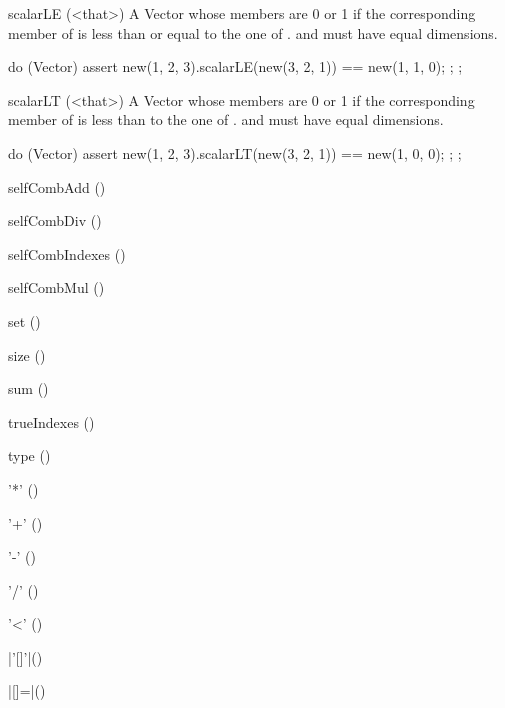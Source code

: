 \begin{urbiscriptapi}
\item[scalarLE](<that>)%
  A Vector whose members are 0 or 1 if the corresponding member of \this is
  less than or equal to the one of \that.  \this and \that must have equal
  dimensions.
\begin{urbiscript}
do (Vector)
{
  assert
  {
    new(1, 2, 3).scalarLE(new(3, 2, 1)) == new(1, 1, 0);
  };
};
\end{urbiscript}

\item[scalarLT](<that>)%
  A Vector whose members are 0 or 1 if the corresponding member of \this is
  less than to the one of \that.  \this and \that must have equal
  dimensions.
\begin{urbiscript}
do (Vector)
{
  assert
  {
    new(1, 2, 3).scalarLT(new(3, 2, 1)) == new(1, 0, 0);
  };
};
\end{urbiscript}

\item[selfCombAdd]()%

\item[selfCombDiv]()%

\item[selfCombIndexes]()%

\item[selfCombMul]()%

\item[set]()%

\item[size]()%

\item[sum]()%

\item[trueIndexes]()%

\item[type]()%

\item['*']()%

\item['+']()%

\item['-']()%

\item['/']()%

\item['<']()%

\item|'[]'|()%

\item|[]=|()%

\end{urbiscriptapi}

